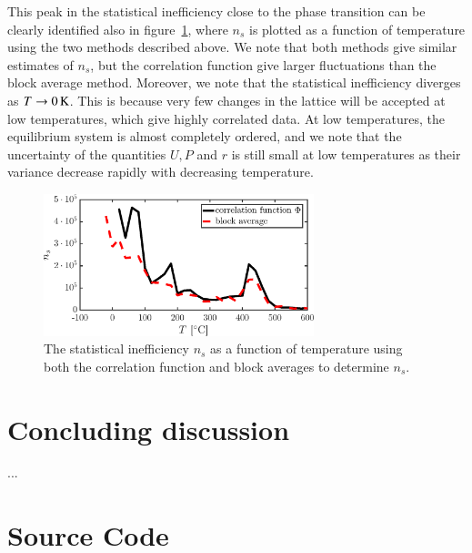 This peak in the statistical inefficiency close to the phase transition can be clearly identified also in figure~\ref{fig:ns_both}, where $n_s$ is plotted as a function of temperature using the two methods described above. We note that both methods give similar estimates of $n_s$, but the correlation function give larger fluctuations than the block average method. Moreover, we note that the statistical inefficiency diverges as $T \rightarrow \unit[0]{K}$. This is because very few changes in the lattice will be accepted at low temperatures, which give highly correlated data. At low temperatures, the equilibrium system is almost completely ordered, and we note that the uncertainty of the quantities $U, P$ and $r$ is still small at low temperatures as their variance decrease rapidly with decreasing temperature. 

\begin{figure}[!ht]
\begin{center}
  \includegraphics[width=0.7\textwidth]{../figures/stat_inefficiency_both} 
  \caption{The statistical inefficiency $n_s$ as a function of temperature using both the correlation function and block averages to determine $n_s$.}
  \label{fig:ns_both}
\end{center}
\end{figure}
\section*{Concluding discussion}
 ...  
\newpage

\appendix

\section{Source Code}

%

